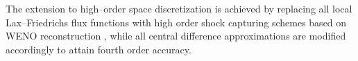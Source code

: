 \documentclass[final,11pt]{siamart251216}
\numberwithin{equation}{section}
\theoremstyle{definition}
\theoremstyle{remark}
\begin{document}
The extension to high–order space discretization is achieved by replacing all local Lax–Friedrichs flux functions with high order shock capturing schemes based on WENO reconstruction \cite{Shu}, while all central difference approximations are modified accordingly to attain fourth order accuracy.
\end{document}
